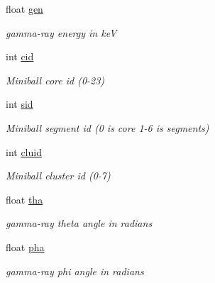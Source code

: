 \begin{DoxyCompactItemize}
\item 
\mbox{\label{classmbevts_aaa4ca32ce18c059a2603bc496d9abf9c}} 
float \hyperlink{classmbevts_aaa4ca32ce18c059a2603bc496d9abf9c}{gen}
\begin{DoxyCompactList}\small\item\em gamma-\/ray energy in keV \end{DoxyCompactList}\item 
\mbox{\label{classmbevts_a4d95d8f16b4de9d05dd5b69b43955459}} 
int \hyperlink{classmbevts_a4d95d8f16b4de9d05dd5b69b43955459}{cid}
\begin{DoxyCompactList}\small\item\em Miniball core id (0-\/23) \end{DoxyCompactList}\item 
\mbox{\label{classmbevts_a16240b10e7070e1f3c1b6b9f55226609}} 
int \hyperlink{classmbevts_a16240b10e7070e1f3c1b6b9f55226609}{sid}
\begin{DoxyCompactList}\small\item\em Miniball segment id (0 is core 1-\/6 is segments) \end{DoxyCompactList}\item 
\mbox{\label{classmbevts_af6d424478b900af3bc8bce1f4c714105}} 
int \hyperlink{classmbevts_af6d424478b900af3bc8bce1f4c714105}{cluid}
\begin{DoxyCompactList}\small\item\em Miniball cluster id (0-\/7) \end{DoxyCompactList}\item 
\mbox{\label{classmbevts_a5c1c8f1af2a4dc025837672a2e85d492}} 
float \hyperlink{classmbevts_a5c1c8f1af2a4dc025837672a2e85d492}{tha}
\begin{DoxyCompactList}\small\item\em gamma-\/ray theta angle in radians \end{DoxyCompactList}\item 
\mbox{\label{classmbevts_aaffc37faf260d3c5a495ab1c1085655d}} 
float \hyperlink{classmbevts_aaffc37faf260d3c5a495ab1c1085655d}{pha}
\begin{DoxyCompactList}\small\item\em gamma-\/ray phi angle in radians \end{DoxyCompactList}\item 

\end{DoxyCompactItemize}

